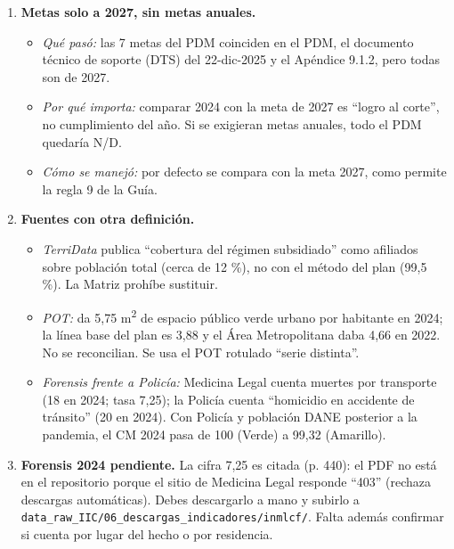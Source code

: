 \documentclass[11pt,letterpaper]{article}
\begin{document}
\begin{enumerate}
\begin{itemize}
\item \emph{Por qué importa:} DSI da 0 (Rojo) en 2024 y 2025 y arrastra al ICRCS.
\item \emph{Cómo se manejó:} con todo lo publicado hasta hoy, 2024 da 28,57 (sigue Rojo). Si Forensis 2024 hubiera salido antes del límite, sería 14,3. Las evaluaciones del PDM de la Alcaldía solo publican indicadores de producto, no de resultado.
\end{itemize}
\item \textbf{Metas solo a 2027, sin metas anuales.}
\begin{itemize}
\item \emph{Qué pasó:} las 7 metas del PDM coinciden en el PDM, el documento técnico de soporte (DTS) del 22-dic-2025 y el Apéndice 9.1.2, pero todas son de 2027.
\item \emph{Por qué importa:} comparar 2024 con la meta de 2027 es ``logro al corte'', no cumplimiento del año. Si se exigieran metas anuales, todo el PDM quedaría N/D.
\item \emph{Cómo se manejó:} por defecto se compara con la meta 2027, como permite la regla 9 de la Guía.
\end{itemize}
\item \textbf{Fuentes con otra definición.}
\begin{itemize}
\item \emph{TerriData} publica ``cobertura del régimen subsidiado'' como afiliados sobre población total (cerca de 12 \%), no con el método del plan (99,5 \%). La Matriz prohíbe sustituir.
\item \emph{POT:} da 5,75 m\textsuperscript{2} de espacio público verde urbano por habitante en 2024; la línea base del plan es 3,88 y el Área Metropolitana daba 4,66 en 2022. No se reconcilian. Se usa el POT rotulado ``serie distinta''.
\item \emph{Forensis frente a Policía:} Medicina Legal cuenta muertes por transporte (18 en 2024; tasa 7,25); la Policía cuenta ``homicidio en accidente de tránsito'' (20 en 2024). Con Policía y población DANE posterior a la pandemia, el CM 2024 pasa de 100 (Verde) a 99,32 (Amarillo).
\end{itemize}
\item \textbf{Forensis 2024 pendiente.} La cifra 7,25 es citada (p. 440): el PDF no está en el repositorio porque el sitio de Medicina Legal responde ``403'' (rechaza descargas automáticas). Debes descargarlo a mano y subirlo a \texttt{\footnotesize data\_\allowbreak{}raw\_\allowbreak{}IIC/\allowbreak{}06\_\allowbreak{}descargas\_\allowbreak{}indicadores/\allowbreak{}inmlcf/\allowbreak{}}. Falta además confirmar si cuenta por lugar del hecho o por residencia.

\end{enumerate}
\end{document}
